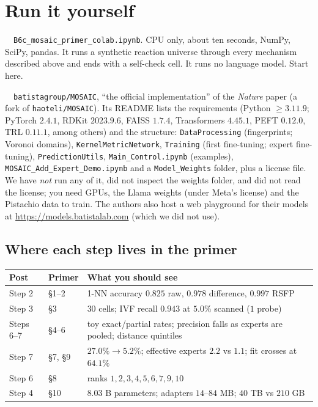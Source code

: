 \documentclass[11pt]{article}
\newcommand{\urlrepo}{https://github.com/batistagroup/MOSAIC}
\newcommand{\colaburlprimer}{https://colab.research.google.com/github/YOUR-USER/YOUR-REPO/blob/main/notebooks/B6c_mosaic_primer_colab.ipynb}
\newcommand{\colabbutton}[2]{%
  \href{#1}{\tcbox[on line,colback=orange!15,colframe=orange!70!black,boxrule=0.6pt,arc=3pt,
    left=4pt,right=4pt,top=1pt,bottom=1pt]{\small\textbf{$\blacktriangleright$ #2}}}}
\begin{document}
\section{Run it yourself}
\label{sec:runit}
\begin{keybox}
\begin{description}[leftmargin=0pt, nosep, labelindent=0pt]
  \item[Primer] \colabbutton{\colaburlprimer}{Open the primer}\ \ \texttt{B6c\_mosaic\_primer\_colab.ipynb}. CPU only, about ten seconds, NumPy, SciPy, pandas. It runs a synthetic reaction universe through every mechanism described above and ends with a self-check cell. It runs no language model. Start here.
  \item[The authors' repository] \colabbutton{\urlrepo}{Open the repository}\ \ \texttt{batistagroup/MOSAIC}, ``the official implementation'' of the \emph{Nature} paper (a fork of \texttt{haoteli/MOSAIC}). Its README lists the requirements (Python $\ge3.11.9$; PyTorch $2.4.1$, RDKit $2023.9.6$, FAISS $1.7.4$, Transformers $4.45.1$, PEFT $0.12.0$, TRL $0.11.1$, among others) and the structure: \texttt{DataProcessing} (fingerprints; Voronoi domains), \texttt{KernelMetricNetwork}, \texttt{Training} (first fine-tuning; expert fine-tuning), \texttt{PredictionUtils}, \texttt{Main\_Control.ipynb} (examples), \texttt{MOSAIC\_Add\_Expert\_Demo.ipynb} and a \texttt{Model\_Weights} folder, plus a license file. We have \emph{not} run any of it, did not inspect the weights folder, and did not read the license; you need GPUs, the Llama weights (under Meta's license) and the Pistachio data to train. The authors also host a web playground for their models at \url{https://models.batistalab.com} (which we did not use).
\end{description}
\end{keybox}

\subsection{Where each step lives in the primer}
\begin{center}
\small
\begin{tabular}{@{}llp{6.5cm}@{}}
\toprule
Post & Primer & What you should see\\
\midrule
Step 2 & \S1--2 & 1-NN accuracy $0.825$ raw, $0.978$ difference, $0.997$ RSFP\\
Step 3 & \S3 & $30$ cells; IVF recall $0.943$ at $5.0\%$ scanned ($1$ probe)\\
Steps 6--7 & \S4--6 & toy exact/partial rates; precision falls as experts are pooled; distance quintiles\\
Step 7 & \S7, \S9 & $27.0\%\to5.2\%$; effective experts $2.2$ vs $1.1$; fit crosses at $64.1\%$\\
Step 6 & \S8 & ranks $1,2,3,4,5,6,7,9,10$\\
Step 4 & \S10 & $8.03$ B parameters; adapters $14$--$84$ MB; $40$ TB vs $210$ GB\\
\bottomrule
\end{tabular}
\end{center}
\end{document}
